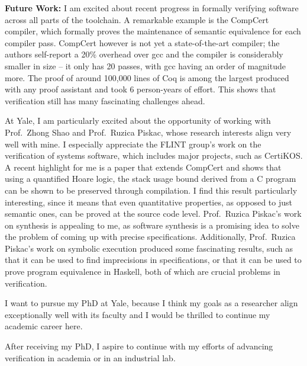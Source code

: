 \documentclass{article}
\newcommand{\school}{Yale\xspace}
\newcommand{\profOne}{Prof.\ Zhong Shao\xspace}
\newcommand{\profTwo}{Prof.\ Ruzica Piskac\xspace}
\begin{document}
\textbf{Future Work:}
I am excited about recent progress in formally verifying software across all parts of the toolchain. A remarkable example is the CompCert compiler, which formally proves the maintenance of semantic equivalence for each compiler pass. CompCert however is not yet a state-of-the-art compiler; the authors self-report a 20\% overhead over gcc and the compiler is considerably smaller in size -- it only has 20 passes, with gcc having an order of magnitude more. The proof of around 100,000 lines of Coq is among the largest produced with any proof assistant and took 6 person-years of effort. This shows that verification still has many fascinating challenges ahead.

At \school, I am particularly excited about the opportunity of working with \profOne and \profTwo, whose research interests align very well with mine. I especially appreciate the FLINT group's work on the verification of systems software, which includes major projects, such as CertiKOS. A recent highlight for me is a paper that extends CompCert and shows that using a quantified Hoare logic, the stack usage bound derived from a C program can be shown to be preserved through compilation. I find this result particularly interesting, since it means that even quantitative properties, as opposed to just semantic ones, can be proved at the source code level. \profTwo's work on synthesis is appealing to me, as software synthesis is a promising idea to solve the problem of coming up with precise specifications. Additionally, \profTwo's work on symbolic execution produced some fascinating results, such as that it can be used to find imprecisions in specifications, or that it can be used to prove program equivalence in Haskell, both of which are crucial problems in verification.

I want to pursue my PhD at \school, because I think my goals as a researcher align exceptionally well with its faculty and I would be thrilled to continue my academic career here.

After receiving my PhD, I aspire to continue with my efforts of advancing verification in academia or in an industrial lab.

\vspace{0.125in}
\end{document}
